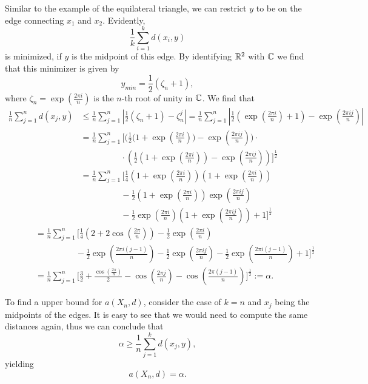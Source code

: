 \begin{example}
\begin{centering}
	\end{centering}
Similar to the example of the equilateral triangle, we can restrict $y$ to be on the edge connecting $x_1$ and $x_2$. Evidently, 
\[
\frac{1}{k}\sum_{i=1}^k d(x_i,y)
\]
is minimized, if $y$ is the midpoint of this edge. By identifying $\mathbb{R}^2$ with $\mathbb{C}$ we find that this minimizer is given by \[y_{min}=\frac{1}{2}(\zeta_n+1),\] where $\zeta_n=\exp\left(\frac{2\pi i}{n}\right)$ is the $n$-th root of unity in $\mathbb{C}$. We find that
\newcommand{\zetan}{\exp\left(\frac{2\pi i}{n}\right)}
\newcommand{\zetanj}{\exp\left(\frac{2\pi i j}{n}\right)}
\newcommand{\zetancc}{\exp\left(\frac{2\pi i}{n}\right)}
\newcommand{\zetanjcc}{\exp\left(\frac{2\pi i j}{n}\right)}
\begin{align*}
\frac{1}{n}\sum_{j=1}^n d(x_j,y)&\leq \frac{1}{n}\sum_{j=1}^n \left|\frac{1}{2}(\zeta_n+1)-\zeta_n^j\right|=\frac{1}{n}\sum_{j=1}^n \left|\frac{1}{2}(\exp\left(\frac{2\pi i}{n}\right)+1)-\exp\left(\frac{2\pi i j}{n}\right)\right|
\\
&=\frac{1}{n}\sum_{j=1}^n \bigg[\bigg(\frac{1}{2}\bigg(1+\zetan\bigg)-\zetanj\bigg)\cdot
	\\&\hspace{2cm}\cdot
	\left(\frac{1}{2}\left(1+\zetancc\right)-\zetanjcc\right)\bigg]^{\frac{1}{2}}
\\
&=\frac{1}{n}\sum_{j=1}^n\bigg[\frac{1}{4}\left(1+\zetan\right)\left(1+\zetancc\right)
	\\&\hspace{2cm}
	-\frac{1}{2}\left(1+\zetan\right)\zetanjcc
	\\&\hspace{2cm}
	-\frac{1}{2}\zetan\left(1+\zetanjcc\right)+1\bigg]^{\frac{1}{2}}
\end{align*}
\begin{align*}
	\hspace{1cm}&=\frac{1}{n}\sum_{j=1}^n\bigg[\frac{1}{4}\left(2+2\cos\left(\frac{2\pi}{n}\right)\right)-\frac{1}{2}\zetancc
	\\
	&\hspace{2cm}-\frac{1}{2}\exp\left(\frac{2\pi i (j-1)}{n}\right)-\frac{1}{2}\zetanj
	-\frac{1}{2}\exp\left(\frac{2\pi i(j-1)}{n}\right)+1\bigg]^{\frac{1}{2}}
\\
&=\frac{1}{n}\sum_{j=1}^n\bigg[\frac{3}{2}+\frac{\cos\left(\frac{2\pi}{n}\right)}{2}-\cos\left(\frac{2\pi j}{n}\right)-\cos(\frac{2\pi(j-1)}{n})\bigg]^{\frac{1}{2}}:=\alpha.
\end{align*}

To find a upper bound for $a(X_n,d)$, consider the case of $k=n$ and $x_j$ being the midpoints of the edges. It is easy to see that we would need to compute the same distances again, thus we can conclude that
\[
\alpha\geq \frac{1}{n}\sum_{j=1}^k d(x_j,y),
\]
yielding
\[
a(X_n,d)=\alpha.
\]
\end{example}


